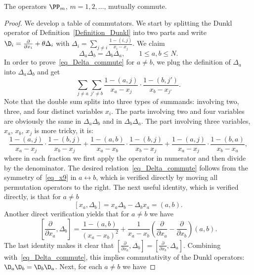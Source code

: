 \begin{lemma} \label{Lemma_commute}
 The operators $\PP_m$, $m=1,2,\dots$, mutually commute.
\end{lemma}
\begin{proof}
 We develop a table of commutators. We start by splitting the Dunkl operator of Definition~\ref{Definition_Dunkl} into two parts and write $\D_i=\frac{\partial}{\partial x_i} + \theta \Delta_i$ with $\Delta_i=\sum_{j\ne i} \frac{1-(i,j)}{x_i-x_j}$.
 We claim
 \begin{equation}
 \label{eq_Delta_commute}
  \Delta_a \Delta_b = \Delta_b \Delta_a,\qquad 1\le a,b \le N.
 \end{equation}
 In order to prove~\eqref{eq_Delta_commute} for $a\ne b$, we plug the definition of $\Delta_a$ into $\Delta_a\Delta_b$ and get
 $$
  \sum_{j\ne a} \sum_{j'\ne b} \frac{1-(a,j)}{x_a-x_j} \cdot \frac{1-(b,{j'})}{x_b-x_{j'}}.
 $$
 Note that the double sum splits into three types of summands: involving two, three, and four distinct variables $x_i$. The parts involving two and four variables are obviously the same in $\Delta_a \Delta_b$ and in $\Delta_b \Delta_a$. The part involving three variables, $x_a$, $x_b$, $x_j$ is more tricky, it is:
 \begin{equation}
 \label{eq_x9}
  \frac{1-(a,j)}{x_a-x_j} \cdot  \frac{1-(b,j)}{x_b-x_j} +   \frac{1-(a,b)}{x_a-x_b} \cdot  \frac{1-(b,j)}{x_b-x_j} +   \frac{1-(a,j)}{x_a-x_j} \cdot  \frac{1-(b,a)}{x_b-x_a},
 \end{equation}
 where in each fraction we first apply the operator in numerator and then divide by the denominator. The desired relation~\eqref{eq_Delta_commute} follows from the symmetry of~\eqref{eq_x9} in $a\leftrightarrow b$, which is verified directly by moving all permutation operators to the right.
 The next useful identity, which is verified directly, is that for $a\ne b$
 \begin{equation}
 \label{eq_x14}
  [x_a,\Delta_b]=x_a \Delta_b- \Delta_b x_a=(a,b).
 \end{equation}
 Another direct verification yields that for $a\ne b$ we have
 \begin{equation} \label{eq_x15}
  \left[\frac{\partial}{\partial x_a},\Delta_b\right]=\frac{1-(a,b)}{(x_a-x_b)^2} +\frac{1}{x_a-x_b} \left(\frac{\partial}{\partial x_a}-\frac{\partial}{\partial x_b}\right) (a,b).
 \end{equation}
 The last identity makes it clear that $\left[\tfrac{\partial}{\partial x_a},\Delta_b\right]= \left[\tfrac{\partial}{\partial x_b},\Delta_a\right]$. Combining with~\eqref{eq_Delta_commute}, this implies commutativity of the Dunkl operators: $\D_a \D_b=\D_b \D_a$. Next, for each $ a \ne b $ we have

\end{proof}
